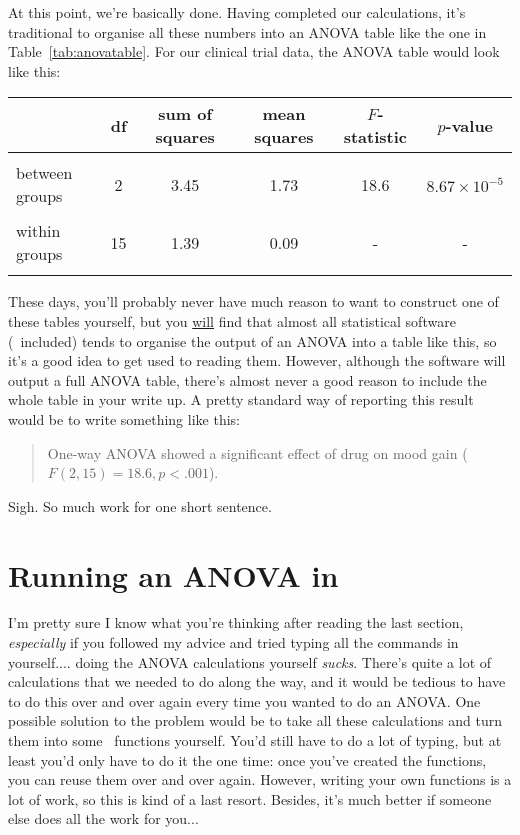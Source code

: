 At this point, we're basically done. Having completed our calculations, it's traditional to organise all these numbers into an ANOVA table like the one in Table~\ref{tab:anovatable}. For our clinical trial data, the ANOVA table would look like this:
\begin{center}
\begin{tabular}{l|ccccc} 
& df & sum of squares & mean squares & $F$-statistic & $p$-value \\  \hline \\ 
between groups & 2 & 3.45 & 1.73 & 18.6 & $8.67 \times 10^{-5}$ \\ \\
within groups   & 15 & 1.39 & 0.09 & - & - \\ \\ 
\end{tabular}
\end{center}
\noindent
These days, you'll probably never have much reason to want to construct one of these tables yourself, but you \underline{will} find that almost all statistical software (\R\ included) tends to organise the output of an ANOVA into a table like this, so it's a good idea to get used to reading them. However, although the software will output a full ANOVA table, there's almost never a good reason to include the whole table in your write up. A pretty standard way of reporting this result would be to write something like this:
\begin{quote}
One-way ANOVA showed a significant effect of drug on mood gain ($F(2,15) = 18.6, p<.001$).
\end{quote}
Sigh. So much work for one short sentence.


\section{Running an ANOVA in \R \label{sec:introduceaov}}

I'm pretty sure I know what you're thinking after reading the last section, {\it especially} if you followed my advice and tried typing all the commands in yourself.... doing the ANOVA calculations yourself {\it sucks}. There's quite a lot of calculations that we needed to do along the way, and it would be tedious to have to do this over and over again every time you wanted to do an ANOVA. One possible solution to the problem would be to take all these calculations and turn them into some \R\ functions yourself. You'd still have to do a lot of typing, but at least you'd only have to do it the one time: once you've created the functions, you can reuse them over and over again. However, writing your own functions is a lot of work, so this is kind of a last resort. Besides, it's much better if someone else does all the work for you...

